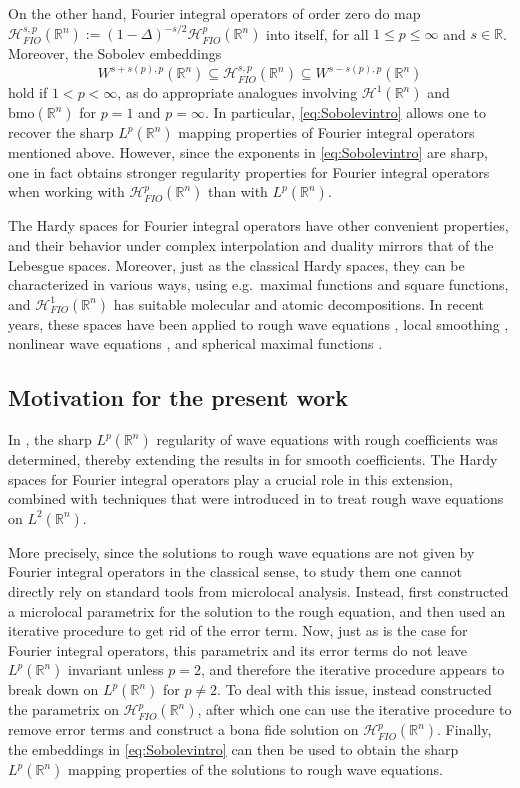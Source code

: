 \documentclass{amsart}
\newcommand {\bmo}{\mathrm{bmo}}
\newcommand {\HT}{\mathcal{H}}
\newcommand {\Hp}{\mathcal{H}^{p}_{FIO}(\Rn)}
\newcommand {\Hps}{\mathcal{H}^{s,p}_{FIO}(\Rn)}
\newcommand {\R}{\mathbb R}
\newcommand {\Rn}{\mathbb{R}^{n}}
\theoremstyle{definition}
\numberwithin{equation}{section}
\begin{document}
On the other hand, Fourier integral operators of order zero do map $\Hps:=(1-\Delta)^{-s/2}\Hp$ into itself, for all $1\leq p\leq \infty$ and $s\in\R$. Moreover, the Sobolev embeddings
\begin{equation}\label{eq:Sobolevintro}
W^{s+s(p),p}(\Rn)\subseteq \Hps\subseteq W^{s-s(p),p}(\Rn)
\end{equation}
hold if $1<p<\infty$, as do appropriate analogues involving $\HT^{1}(\Rn)$ and $\bmo(\Rn)$ for $p=1$ and $p=\infty$. In particular, \eqref{eq:Sobolevintro} allows one to recover the sharp $L^{p}(\Rn)$ mapping properties of Fourier integral operators mentioned above. However, since the exponents in \eqref{eq:Sobolevintro} are sharp, one in fact obtains stronger regularity properties for Fourier integral operators when working with $\Hp$ than with $L^{p}(\Rn)$. 

The Hardy spaces for Fourier integral operators have other convenient properties, and their behavior under complex interpolation and duality mirrors that of the Lebesgue spaces. Moreover, just as the classical Hardy spaces, they can be characterized in various ways, using e.g.~maximal functions and square functions, and $\HT^{1}_{FIO}(\Rn)$ has suitable molecular and atomic decompositions. In recent years, these spaces have been applied to rough wave equations \cite{Hassell-Rozendaal23}, local smoothing  \cite{Rozendaal22b,LiRoSoYa24}, nonlinear wave equations \cite{Rozendaal-Schippa23}, and spherical maximal functions \cite{GhLiRoSo24}. 


\subsection{Motivation for the present work}

In \cite{Hassell-Rozendaal23}, the sharp $L^{p}(\Rn)$ regularity of wave equations with rough coefficients was determined, thereby extending the results in \cite{SeSoSt91} for smooth coefficients. The Hardy spaces for Fourier integral operators play a crucial role in this extension, combined with techniques that were introduced in \cite{Smith98b} to treat rough wave equations on $L^{2}(\Rn)$.

More precisely, since the solutions to rough wave equations are not given by Fourier integral operators in the classical sense, to study them one cannot directly rely on standard tools from microlocal analysis. Instead, \cite{Smith98b} first constructed a microlocal parametrix for the solution to the rough equation, and then used an iterative procedure to get rid of the error term. Now, just as is the case for Fourier integral operators, this parametrix and its error terms do not leave $L^{p}(\Rn)$ invariant unless $p=2$, and therefore the iterative procedure appears to break down on $L^{p}(\Rn)$ for $p\neq 2$. To deal with this issue, \cite{Hassell-Rozendaal23} instead constructed the parametrix on $\Hp$, after which one can use the iterative procedure to remove error terms and construct a bona fide solution on $\Hp$. Finally, the embeddings in \eqref{eq:Sobolevintro} can then be used to obtain the sharp $L^{p}(\Rn)$ mapping properties of the solutions to rough wave equations.
\end{document}
